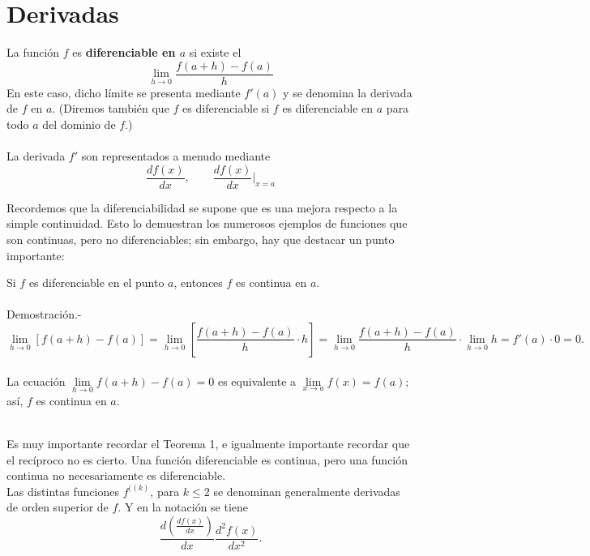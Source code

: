 \chapter{Derivadas}

\begin{tcolorbox}
    \begin{def.}
    La función $f$ es \textbf{\boldmath diferenciable en $a$} si existe el  
    $$\lim_{h\to 0}\dfrac{f(a+h)-f(a)}{h}$$
    En este caso, dicho límite se presenta mediante $f'(a)$ y se denomina la derivada de $f$ en $a$. (Diremos también que $f$ es diferenciable si $f$ es diferenciable en $a$ para todo $a$ del dominio de $f.$)\\\\
    La derivada $f'$ son representados a menudo mediante
    $$\dfrac{df(x)}{dx}, \qquad \dfrac{df(x)}{dx}\bigg|_{x=a}$$
    \end{def.}
\end{tcolorbox}

Recordemos que la diferenciabilidad se supone que es una mejora respecto a la simple continuidad. Esto lo demuestran los numerosos ejemplos de funciones que son continuas, pero no diferenciables; sin embargo, hay que destacar un punto importante:\\

\begin{teo}
    Si $f$ es diferenciable en el punto $a$, entonces $f$ es continua en $a$.\\\\
	Demostración.-\;
	$$\lim_{h\to 0} \left[f(a+h)-f(a)\right] = \lim_{h\to 0} \left[\dfrac{f(a+h)-f(a)}{h}\cdot h\right] = \lim_{h\to 0} \dfrac{f(a+h)-f(a)}{h}\cdot \lim_{h\to 0} h = f'(a)\cdot 0 = 0.$$\\
	La ecuación $\lim\limits_{h\to 0}f(a+h)-f(a)=0$ es equivalente a $\lim\limits_{x\to a} f(x)=f(a);$ así, $f$ es continua en $a$.\\\\
\end{teo}

Es muy importante recordar el Teorema 1, e igualmente importante recordar que el recíproco no es cierto. Una función diferenciable es continua, pero una función continua no necesariamente es diferenciable.\\

Las distintas funciones $f^{((k)}$, para $k\leq 2$ se denominan generalmente derivadas de orden superior de $f$. Y en la notación se tiene $$\dfrac{d\left(\frac{df(x)}{dx}\right)}{dx}\dfrac{d^2f(x)}{dx^2}.$$

